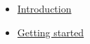 \usepackage{hyperref}
\begin{itemize}
  \item \href{cover.tex}{Introduction}
  \item \href{chapter.tex}{Getting started}
\end{itemize}
